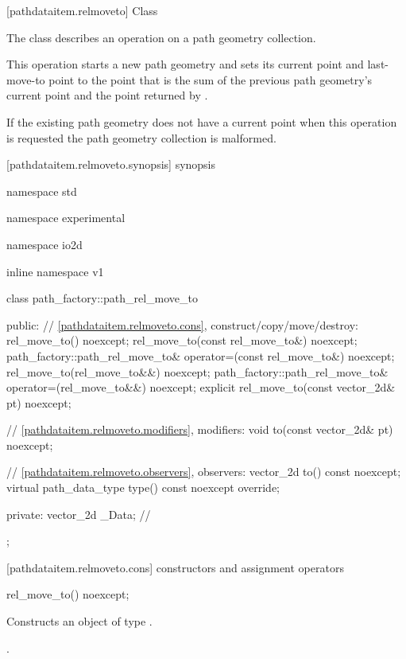  [pathdataitem.relmoveto] {Class }

\pnum
{}
The class  describes an operation on a path geometry collection.

\pnum
This operation starts a new path geometry and sets its current point and last-move-to point to the point that is the sum of the previous path geometry's current point and the point returned by .

\pnum
If the existing path geometry does not have a current point when this operation is requested the path geometry collection is malformed.

 [pathdataitem.relmoveto.synopsis] { synopsis}

\begin{codeblock}
namespace std { namespace experimental { namespace io2d { inline namespace v1 {
  class path_factory::path_rel_move_to {
  public:
    // \ref{pathdataitem.relmoveto.cons}, construct/copy/move/destroy:
    rel_move_to() noexcept;
    rel_move_to(const rel_move_to&) noexcept;
    path_factory::path_rel_move_to& operator=(const rel_move_to&) noexcept;
    rel_move_to(rel_move_to&&) noexcept;
    path_factory::path_rel_move_to& operator=(rel_move_to&&) noexcept;
    explicit rel_move_to(const vector_2d& pt) noexcept;

    // \ref{pathdataitem.relmoveto.modifiers}, modifiers:
    void to(const vector_2d& pt) noexcept;

    // \ref{pathdataitem.relmoveto.observers}, observers:
    vector_2d to() const noexcept;
    virtual path_data_type type() const noexcept override;
    
  private:
    vector_2d _Data; // \expos
  };
} } } }
\end{codeblock}

 [pathdataitem.relmoveto.cons] { constructors and assignment operators}

\begin{itemdecl}
    rel_move_to() noexcept;
\end{itemdecl}
\begin{itemdescr}
	\pnum
	\effects
	Constructs an object of type .
	
	\pnum
	\postconditions
	.
\end{itemdescr}

